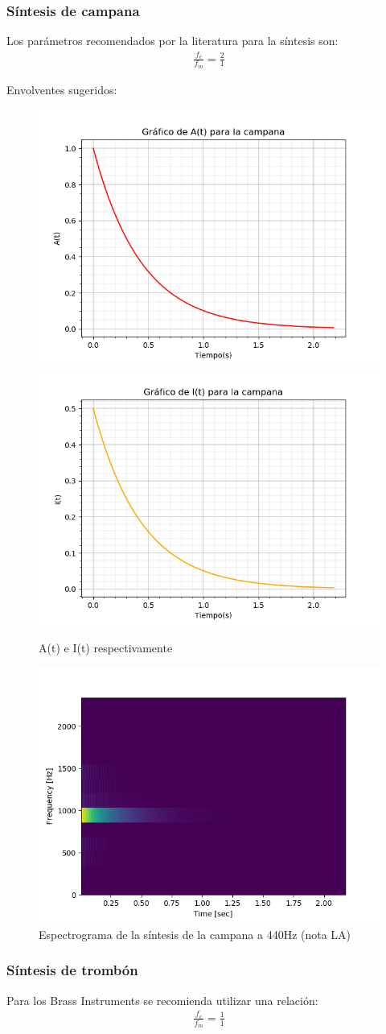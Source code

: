 \documentclass[assd_tp2_main.tex]{subfiles}
\begin{document}
\newpage

\subsubsection{Síntesis de campana}
Los parámetros recomendados por la literatura para la síntesis son:
\begin{eqnarray*}
\displaystyle \frac{f_c}{f_m}=\frac{2}{1}
\end{eqnarray*}
\par
Envolventes sugeridos:
\begin{figure}[H]
\centering
\includegraphics[width=0.4\linewidth]{graficos/EJ4/at_bell.png}
\includegraphics[width=0.4\linewidth]{graficos/EJ4/it_bell.png}
\caption{A(t) e I(t) respectivamente}
\label{fig:bell_envelopes}
\end{figure}

\begin{figure}[H]
\centering
\includegraphics[width=0.4\linewidth]{graficos/EJ4/BellEspectogram440Hz.png}
\caption{Espectrograma de la síntesis de la campana a 440Hz (nota LA)}
\label{fig:bell_440}
\end{figure}

\newpage

\subsubsection{Síntesis de trombón}
Para los Brass Instruments se recomienda utilizar una relación:
\begin{eqnarray*}
\displaystyle \frac{f_c}{f_m}=\frac{1}{1}
\end{eqnarray*}
\end{document}
